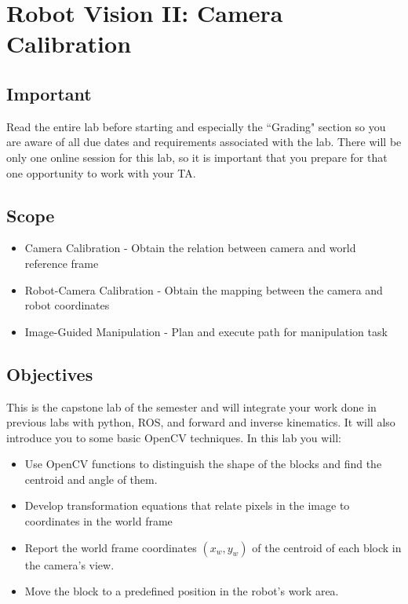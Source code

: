 \chapter{Robot Vision II: Camera Calibration}



\section{Important}
Read the entire lab before starting and especially the ``Grading" section so you are aware of all due dates and requirements associated with the lab.  There will be only one online session for this lab, so it is important that you prepare for that one opportunity to work with your TA.

\section{Scope}
\begin{itemize}
    \item Camera Calibration - Obtain the relation between camera and world reference frame
    \item Robot-Camera Calibration - Obtain the mapping between the camera and robot coordinates
    \item Image-Guided Manipulation - Plan and execute path for manipulation task
\end{itemize}    

\section{Objectives}

This is the capstone lab of the semester and will integrate your work done in previous labs with python, ROS, and forward and inverse kinematics.  It will also introduce you to some basic OpenCV techniques.  In this lab you will:
\begin{itemize}
	\item Use OpenCV functions to distinguish the shape of the blocks and find the centroid and angle of them.
	\item Develop transformation equations that relate pixels in the image to coordinates in the world frame
	\item Report the world frame coordinates $(x_w,y_w)$ of the centroid of each block in the camera’s view.
	\item Move the block to a predefined position in the robot's work area.
\end{itemize}


